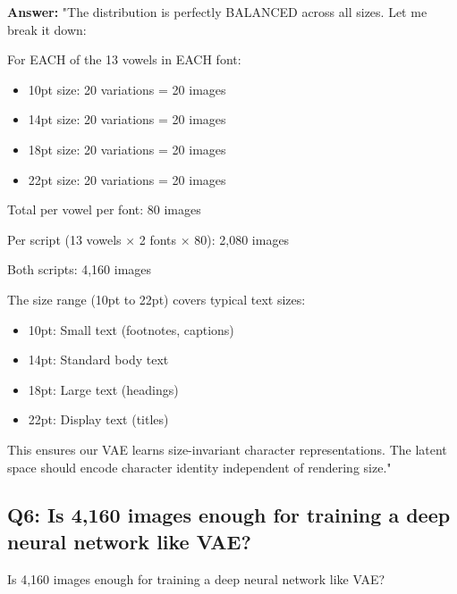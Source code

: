 \documentclass[11pt,a4paper]{article}
\begin{document}
\begin{answerbox}
\textbf{Answer:} "The distribution is perfectly BALANCED across all sizes. Let me break it down:

For EACH of the 13 vowels in EACH font:
\begin{itemize}
\item 10pt size: 20 variations = 20 images
\item 14pt size: 20 variations = 20 images
\item 18pt size: 20 variations = 20 images
\item 22pt size: 20 variations = 20 images
\end{itemize}

Total per vowel per font: 80 images

Per script (13 vowels × 2 fonts × 80): 2,080 images

Both scripts: 4,160 images

The size range (10pt to 22pt) covers typical text sizes:
\begin{itemize}
\item 10pt: Small text (footnotes, captions)
\item 14pt: Standard body text
\item 18pt: Large text (headings)
\item 22pt: Display text (titles)
\end{itemize}

This ensures our VAE learns size-invariant character representations. The latent space should encode character identity independent of rendering size."
\end{answerbox}

\subsection{Q6: Is 4,160 images enough for training a deep neural network like VAE?}

\begin{qbox}[title=Question]
Is 4,160 images enough for training a deep neural network like VAE?
\end{qbox}
\end{document}
